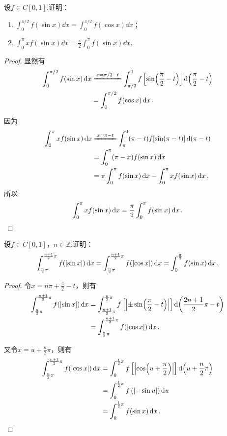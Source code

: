 \begin{example}
设\(f \in C[0,1]\).证明：\begin{enumerate}
\item \(\int_0^{\pi/2} f(\sin x) \dd{x} = \int_0^{\pi/2} f(\cos x) \dd{x}\)；
\item \(\int_0^{\pi} x f(\sin x) \dd{x} = \frac{\pi}{2} \int_0^{\pi} f(\sin x) \dd{x}\).
\end{enumerate}
\begin{proof}
显然有\[
\begin{split}
\int_0^{\pi/2} f(\sin x) \dd{x}
&\xlongequal{x = \pi/2-t} \int_{\pi/2}^0 f\left[\sin(\frac{\pi}{2}-t)\right] \dd(\frac{\pi}{2}-t) \\
&= \int_0^{\pi/2} f(\cos x) \dd{x}.
\end{split}
\]

因为\[
\begin{split}
\int_0^{\pi} x f(\sin x) \dd{x}
&\xlongequal{x = \pi-t} \int_{\pi}^0 (\pi-t) f[\sin(\pi-t)] \dd(\pi-t) \\
&= \int_0^{\pi} (\pi-x) f(\sin x) \dd{x} \\
&= \pi \int_0^{\pi} f(\sin x) \dd{x}
	- \int_0^{\pi} x f(\sin x) \dd{x},
\end{split}
\]所以\[
\int_0^{\pi} x f(\sin x) \dd{x}
= \frac{\pi}{2} \int_0^{\pi} f(\sin x) \dd{x}.
\qedhere
\]
\end{proof}
\end{example}

\begin{example}
设\(f \in C[0,1]\)，\(n\in\mathbb{Z}\).证明：\[
\int_{\frac{n}{2} \pi}^{\frac{n+1}{2} \pi} f(\abs{\sin x}) \dd{x}
= \int_{\frac{n}{2} \pi}^{\frac{n+1}{2} \pi} f(\abs{\cos x}) \dd{x}
= \int_0^{\frac{\pi}{2}} f(\sin x) \dd{x}.
\]
\def\arraystretch{1.5}
\begin{proof}
令\(x = n\pi+\frac{\pi}{2}-t\)，则有\[
\begin{split}
\int_{\frac{n}{2} \pi}^{\frac{n+1}{2} \pi} f(\abs{\sin x}) \dd{x}
&= \int_{\frac{n+1}{2} \pi}^{\frac{n}{2} \pi} f\left[\abs{\pm\sin(\frac{\pi}{2}-t)}\right] \dd(\frac{2n+1}{2}\pi-t) \\
&= \int_{\frac{n}{2} \pi}^{\frac{n+1}{2} \pi} f(\abs{\cos x}) \dd{x}.
\end{split}
\]

又令\(x=u+\frac{n}{2} \pi\)，则有\[
\begin{split}
\int_{\frac{n}{2} \pi}^{\frac{n+1}{2} \pi} f(\abs{\cos x}) \dd{x}
&= \int_0^{\frac{1}{2}\pi} f\left[ \abs{\cos(u+\frac{\pi}{2})} \right] \dd(u+\frac{n}{2}\pi) \\
&= \int_0^{\frac{1}{2}\pi} f\left( \abs{-\sin u} \right) \dd{u} \\
&= \int_0^{\frac{1}{2}\pi} f(\sin x) \dd{x}.
\qedhere
\end{split}
\]
\end{proof}
\end{example}

